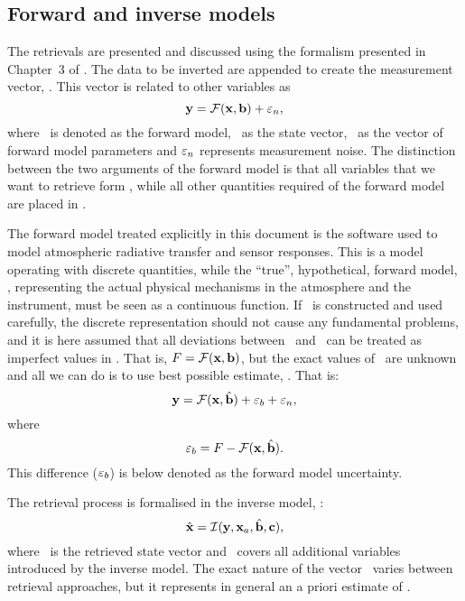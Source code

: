 \subsection{Forward and inverse models}
%
The retrievals are presented and discussed using the formalism presented in
Chapter~3 of \citet{rodgers:00}. The data to be inverted are appended to create
the measurement vector, \MsrVct. This vector is related to other variables as
\begin{equation}
  \label{eq:fmodel1}
  \mathbf{y} = \mathcal{F}(\mathbf{x},\mathbf{b}) + \varepsilon_n,
\end{equation}
where \FrwMdl\ is denoted as the forward model, \SttVct\ as the state vector,
\FrwMdlVct\ as the vector of forward model parameters and $\varepsilon_n$
represents measurement noise. The distinction between the two arguments of the
forward model is that all variables that we want to retrieve form \SttVct,
while all other quantities required of the forward model are placed in
\FrwMdlVct. 

The forward model treated explicitly in this document is the software used to
model atmospheric radiative transfer and sensor responses. This is a model
operating with discrete quantities, while the ``true'', hypothetical, forward
model, \trueFrwMdl, representing the actual physical mechanisms in the atmosphere
and the instrument, must be seen as a continuous function. If \FrwMdl\ is
constructed and used carefully, the discrete representation should not cause
any fundamental problems, and it is here assumed that all deviations between
\trueFrwMdl\ and \FrwMdl\ can be treated as imperfect values in \FrwMdlVct.
That is, $F=\mathcal{F}(\mathbf{x},\mathbf{b})$, but the exact values of
\FrwMdlVct\ are unknown and all we can do is to use best possible estimate,
\FrwMdlVctHat. That is:
\begin{equation}
  \label{eq:fmodel2}
  \mathbf{y} = \mathcal{F}(\mathbf{x},\hat{\mathbf{b}}) + \varepsilon_b + \varepsilon_n,
\end{equation}
where 
\begin{equation}
  \label{eq:eps_b}
  \varepsilon_b = F - \mathcal{F}(\mathbf{x},\hat{\mathbf{b}}).
\end{equation}
This difference ($\varepsilon_b$) is below denoted as the forward model
uncertainty. 

The retrieval process is formalised in the inverse model, \InvMdl:
\begin{equation}
  \label{eq:imodel}
   \hat{\mathbf{x}} = \mathcal{I}(\mathbf{y},\mathbf{x}_{a},\hat{\mathbf{b}},\mathbf{c}),
\end{equation}
where \RtrVct\ is the retrieved state vector and \InvMdlVct\ covers all
additional variables introduced by the inverse model. The exact nature
of the vector \ varies between retrieval approaches, but it 
represents in general an a priori estimate of \SttVct.



